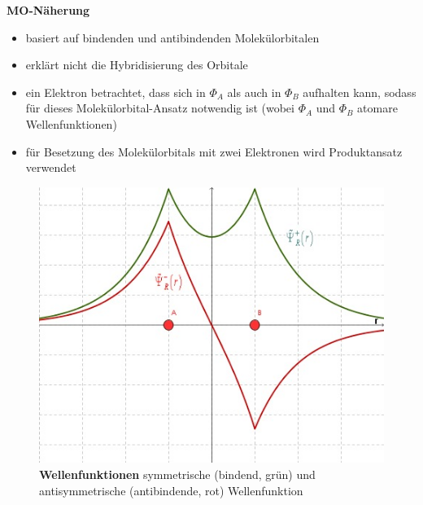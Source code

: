 \noindent
\textbf{MO-Näherung}
\begin{itemize}
    \item basiert auf bindenden und antibindenden Molekülorbitalen
    \item erklärt nicht die Hybridisierung des Orbitale
    \item ein Elektron betrachtet, dass sich in $\Phi_A$ als auch in $\Phi_B$ aufhalten kann, sodass für dieses Molekülorbital-Ansatz notwendig ist (wobei $\Phi_A$ und $\Phi_B$ atomare Wellenfunktionen)
    \item für Besetzung des Molekülorbitals mit zwei Elektronen wird Produktansatz verwendet
\end{itemize}
\label{q:42}
\begin{figure}[H]
    \centering
   \begin{minipage}[b]{.4\linewidth} %
      \includegraphics[width=\linewidth]{resources/16-03-2012/sym_und_antisymm_Wellenfunktion.jpeg}
      \caption{\textbf{Wellenfunktionen} symmetrische (bindend, grün) und antisymmetrische (antibindende, rot) Wellenfunktion}
   \end{minipage}
   \hspace{.1\linewidth}%
   \begin{minipage}[b]{.4\linewidth} %

\end{minipage}
\end{figure}
